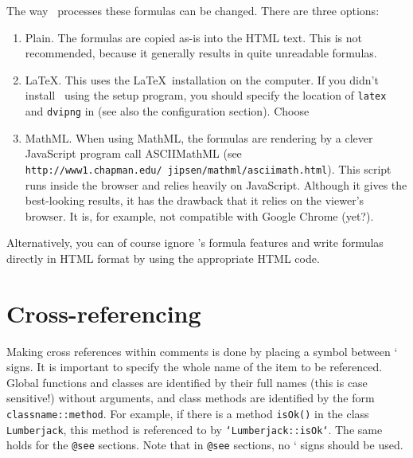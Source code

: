 The way \oxdoc~processes these formulas can be changed.  There are three options:
\begin{enumerate}
\item Plain.  The formulas are copied as-is into the HTML text.  This is not
recommended, because it generally results in quite unreadable formulas.

\item \LaTeX.  This uses the \LaTeX~installation on the computer. If you
didn't install \oxdoc~using the setup program, you should specify the
location of {\tt latex} and {\tt dvipng} in \oxdocxml (see also the configuration
section). Choose


\item MathML.  When using MathML, the formulas are rendering by a clever JavaScript
program call ASCIIMathML (see {\tt http://www1.chapman.edu/~jipsen/mathml/asciimath.html}). 
This script runs inside the browser and relies heavily on JavaScript. Although it gives
the best-looking results, it has the drawback that it relies on the viewer's browser.
It is, for example, not compatible with Google Chrome (yet?).
\end{enumerate}

Alternatively, you can of course ignore \oxdoc's formula features and write
formulas directly in HTML format by using the appropriate HTML code.

\section{Cross-referencing}
Making cross references within comments is done by placing a symbol between ` signs.  It is important to
specify the whole name of the item to be referenced.  Global functions and classes are identified by
their full names (this is case sensitive!) without arguments, and class methods are identified by the
form {\tt classname::method}. For example, if there is a method {\tt isOk()} in the class {\tt Lumberjack},
this method is referenced to by {\tt `Lumberjack::isOk`}.  The same holds for the {\tt @see} sections.
Note that in {\tt @see} sections, no ` signs should be used.


